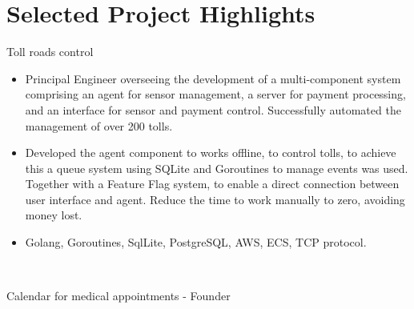 \documentclass[letterpaper]{twentysecondcv} %
\begin{document}
\begin{twentyla} %

\end{twentyla}





\section{Selected Project Highlights}
\begin{twenty}

     \twentyitem
    
    
    {Toll roads control}
    {\href{}{}}
    {}
    {
    
        \begin{itemize}
            \item
	    Principal Engineer overseeing the development of a multi-component system comprising an agent for sensor management, a server for payment processing, and an interface for sensor and payment control. Successfully automated the management of over 200 tolls.
         \end{itemize}
         
        \begin{itemize}
            \item
            Developed the agent component to works offline, to control tolls, to achieve this a queue system using SQLite and Goroutines to manage events was used. 	Together with a Feature Flag system, to enable a direct connection between user interface and agent. Reduce the time to work manually to zero, avoiding money lost.
         \end{itemize} 
         
         \begin{itemize}
            \item
            Golang, Goroutines, SqlLite, PostgreSQL, AWS, ECS, TCP protocol.
         \end{itemize}
         
    }
    \\
    
     \twentyitem

    
    {Calendar for medical appointments - Founder}
    {\href{}{}}
    {}
    {
    
}
\end{twenty}
\end{document}
